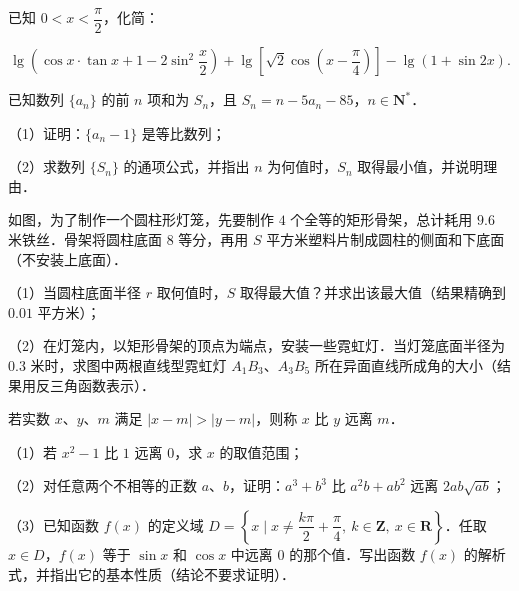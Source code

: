 \begin{question}
已知 $0<x<\dfrac\pi2$，化简：

\nopagebreak[4]
\[\lg\left(\cos x\cdot\tan x+1-2\sin^2\frac x2\right)
+\lg\left[\sqrt2\cos\left(x-\frac\pi4\right)\right]
-\lg(1+\sin2x).\]

\end{question}
\begin{question}
已知数列 $\{a_n\}$ 的前 $n$ 项和为 $S_n$，且 $S_n=n-5a_n-85$，$n\in\mathbf N^*$．

（1）证明：$\{a_n-1\}$ 是等比数列；

（2）求数列 $\{S_n\}$ 的通项公式，并指出 $n$ 为何值时，$S_n$ 取得最小值，并说明理由．

\Needspace{0.4\textheight}
\end{question}
\begingroup
\renewenvironment{question}{\Needspace{0.5\textheight}}{}
\begin{question}
如图，为了制作一个圆柱形灯笼，先要制作 $4$ 个全等的矩形骨架，总计耗用 $9.6$ 米铁丝．骨架将圆柱底面 $8$ 等分，再用 $S$ 平方米塑料片制成圆柱的侧面和下底面（不安装上底面）．

（1）当圆柱底面半径 $r$ 取何值时，$S$ 取得最大值？并求出该最大值（结果精确到 $0.01$ 平方米）；

（2）在灯笼内，以矩形骨架的顶点为端点，安装一些霓虹灯．当灯笼底面半径为 $0.3$ 米时，求图中两根直线型霓虹灯 $A_1B_3$、$A_3B_5$ 所在异面直线所成角的大小（结果用反三角函数表示）．
\nopagebreak[4]
\begin{center}\end{center}
\nopagebreak[4]
\end{question}
\endgroup
\begin{question}
若实数 $x$、$y$、$m$ 满足 $|x-m|>|y-m|$，则称 $x$ 比 $y$ 远离 $m$．

（1）若 $x^2-1$ 比 $1$ 远离 $0$，求 $x$ 的取值范围；

（2）对任意两个不相等的正数 $a$、$b$，证明：$a^3+b^3$ 比 $a^2b+ab^2$ 远离 $2ab\sqrt{ab}$；

（3）已知函数 $f(x)$ 的定义域 $D=\left\{x\mid x\neq\dfrac{k\pi}2+\dfrac\pi4,\ k\in\mathbf Z,\ x\in\mathbf R\right\}$．任取 $x\in D$，$f(x)$ 等于 $\sin x$ 和 $\cos x$ 中远离 $0$ 的那个值．写出函数 $f(x)$ 的解析式，并指出它的基本性质（结论不要求证明）．

\Needspace{0.4\textheight}
\end{question}
\begingroup
\renewenvironment{question}{\Needspace{0.5\textheight}}{}
